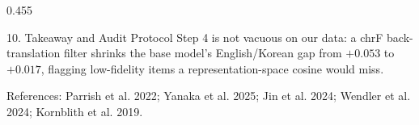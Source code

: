 \documentclass[final]{beamer}
\newlength{\colht}\setlength{\colht}{0.88\paperheight}
\newcommand{\postercol}{0.455\paperwidth}
\newcommand{\smallnote}[1]{{\fontsize{21}{26}\selectfont\color{muted}#1}}
\newcommand{\captionnote}[1]{{\fontsize{27}{34}\selectfont #1}}
\begin{document}
\begin{frame}[t]
\begin{columns}[t,totalwidth=0.94\paperwidth]
\begin{column}{\postercol}
\begin{minipage}[t][\colht][s]{\linewidth}
\begin{block}{10. Takeaway and Audit Protocol}
\smallskip
\captionnote{Step 4 is not vacuous on our data: a chrF back-translation filter shrinks the base model's English/Korean gap from $+0.053$ to $+0.017$, flagging low-fidelity items a representation-space cosine would miss.}

\smallskip
\smallnote{References: Parrish et al. 2022; Yanaka et al. 2025; Jin et al. 2024; Wendler et al. 2024; Kornblith et al. 2019.}
\end{block}

\end{minipage}
\end{column}
\end{columns}
\end{frame}
\end{document}

